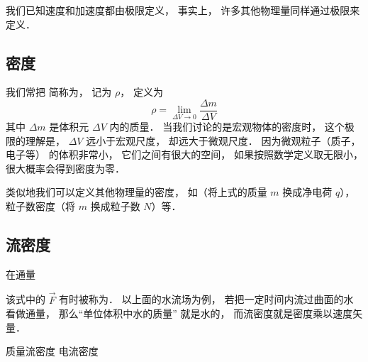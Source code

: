 

我们已知速度和加速度都由极限定义， 事实上， 许多其他物理量同样通过极限来定义．

\subsection{密度}
我们常把 简称为， 记为 $\rho$， 定义为
\begin{equation}
\rho = \lim_{\Delta V \to 0} \frac{\Delta m}{\Delta V}
\end{equation}
其中 $\Delta m$ 是体积元 $\Delta V$ 内的质量． 当我们讨论的是宏观物体的密度时， 这个极限的理解是， $\Delta V$ 远小于宏观尺度， 却远大于微观尺度． 因为微观粒子（质子， 电子等） 的体积非常小， 它们之间有很大的空间， 如果按照数学定义取无限小， 很大概率会得到密度为零．

类似地我们可以定义其他物理量的密度， 如（将上式的质量 $m$ 换成净电荷 $q$）， 粒子数密度（将 $m$ 换成粒子数 $N$）等．

\subsection{流密度}

在通量

该式中的 $\vec F$ 有时被称为． 以上面的水流场为例， 若把一定时间内流过曲面的水看做通量， 那么“单位体积中水的质量” 就是水的， 而流密度就是密度乘以速度矢量．


质量流密度
电流密度
